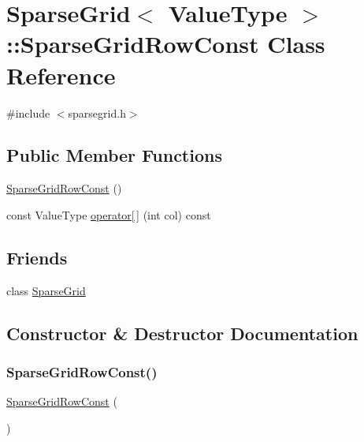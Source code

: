 \hypertarget{classSparseGrid_1_1SparseGridRowConst}{}\section{Sparse\+Grid$<$ Value\+Type $>$\+:\+:Sparse\+Grid\+Row\+Const Class Reference}
\label{classSparseGrid_1_1SparseGridRowConst}


{\ttfamily \#include $<$sparsegrid.\+h$>$}

\subsection*{Public Member Functions}
\begin{DoxyCompactItemize}
\item 
\mbox{\hyperlink{classSparseGrid_1_1SparseGridRowConst_a6e1d4cdf37043e6585ea743f86c54b80}{Sparse\+Grid\+Row\+Const}} ()
\item 
const Value\+Type \mbox{\hyperlink{classSparseGrid_1_1SparseGridRowConst_a3dc8d98145632fca91f860f4f720e219}{operator\mbox{[}$\,$\mbox{]}}} (int col) const
\end{DoxyCompactItemize}
\subsection*{Friends}
\begin{DoxyCompactItemize}
\item 
class \mbox{\hyperlink{classSparseGrid_1_1SparseGridRowConst_a5d011ba21988cd3a0eba846ebda2e527}{Sparse\+Grid}}
\end{DoxyCompactItemize}


\subsection{Constructor \& Destructor Documentation}
\mbox{\label{classSparseGrid_1_1SparseGridRowConst_a6e1d4cdf37043e6585ea743f86c54b80}} 
\subsubsection{\texorpdfstring{Sparse\+Grid\+Row\+Const()}{SparseGridRowConst()}}
{\footnotesize\ttfamily \mbox{\hyperlink{classSparseGrid_1_1SparseGridRowConst}{Sparse\+Grid\+Row\+Const}} (\begin{DoxyParamCaption}{ }\end{DoxyParamCaption})\hspace{0.3cm}{\ttfamily [inline]}}



